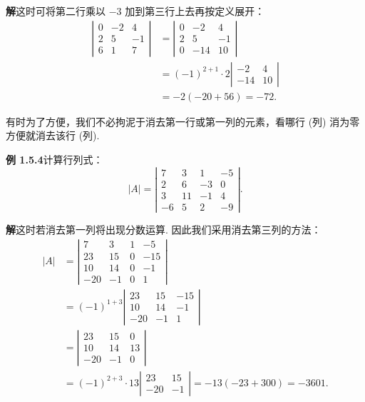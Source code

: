 \documentclass[UTF8,12pt,a4paper,fontset=fandol]{ctexart}
\begin{document}
\noindent\textbf{解}\quad 这时可将第二行乘以 $-3$ 加到第三行上去再按定义展开：
\[
\begin{aligned}
\left|\begin{array}{rrr}
0 & -2 & 4\\
2 & 5 & -1\\
6 & 1 & 7
\end{array}\right|
&=
\left|\begin{array}{rrr}
0 & -2 & 4\\
2 & 5 & -1\\
0 & -14 & 10
\end{array}\right|\\
&=(-1)^{2+1}\cdot 2
\left|\begin{array}{rr}
-2 & 4\\
-14 & 10
\end{array}\right|\\
&=-2(-20+56)=-72.
\end{aligned}
\]

有时为了方便，我们不必拘泥于消去第一行或第一列的元素，看哪行 (列) 消为零方便就消去该行 (列).

\noindent\textbf{例 1.5.4}\quad 计算行列式：
\[
|A|=
\left|\begin{array}{rrrr}
7 & 3 & 1 & -5\\
2 & 6 & -3 & 0\\
3 & 11 & -1 & 4\\
-6 & 5 & 2 & -9
\end{array}\right|.
\]

\noindent\textbf{解}\quad 这时若消去第一列将出现分数运算. 因此我们采用消去第三列的方法：
\[
\begin{aligned}
|A|
&=
\left|\begin{array}{rrrr}
7 & 3 & 1 & -5\\
23 & 15 & 0 & -15\\
10 & 14 & 0 & -1\\
-20 & -1 & 0 & 1
\end{array}\right|\\
&=(-1)^{1+3}
\left|\begin{array}{rrr}
23 & 15 & -15\\
10 & 14 & -1\\
-20 & -1 & 1
\end{array}\right|\\
&=
\left|\begin{array}{rrr}
23 & 15 & 0\\
10 & 14 & 13\\
-20 & -1 & 0
\end{array}\right|\\
&=(-1)^{2+3}\cdot 13
\left|\begin{array}{rr}
23 & 15\\
-20 & -1
\end{array}\right|
=-13(-23+300)=-3601.
\end{aligned}
\]
\end{document}
